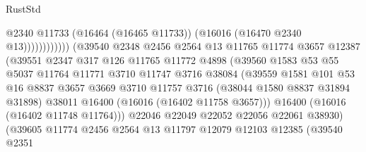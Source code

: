 \begin{lexlean}{RustStd}
\begin{coremodule}
                                              @2340
                                              @11733
                                              (@16464 (@16465 @11733))
                                              (@16016 (@16470 @2340 @13))))))))))))
                          (@39540
                            @2348
                            @2456
                            @2564
                            @13
                            @11765
                            @11774
                            @3657
                            @12387
                            (@39551
                              @2347
                              @317
                              @126
                              @11765
                              @11772
                              @4898
                              (@39560
                                @1583
                                @53
                                @55
                                @5037
                                @11764
                                @11771
                                @3710
                                @11747
                                @3716
                                @38084
                                (@39559
                                  @1581
                                  @101
                                  @53
                                  @16
                                  @8837
                                  @3657
                                  @3669
                                  @3710
                                  @11757
                                  @3716
                                  (@38044 @1580 @8837 @31894 @31898)
                                  @38011
                                  @16400
                                  (@16016 (@16402 @11758 @3657)))
                                @16400
                                (@16016 (@16402 @11748 @11764)))
                              @22046
                              @22049
                              @22052
                              @22056
                              @22061
                              @38930)
                            (@39605
                              @11774
                              @2456
                              @2564
                              @13
                              @11797
                              @12079
                              @12103
                              @12385
                              (@39540
                                @2351

\end{coremodule}
\end{lexlean}
